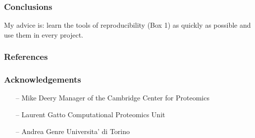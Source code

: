 \documentclass{beamer}
\begin{document}
\begin{frame}
\frametitle{Conclusions}

My advice is: learn the tools of reproducibility (Box 1) as quickly as possible and use them in every project.
\end{frame}


\begin{frame}
\frametitle{References}
\fontsize{6}{7.2}\selectfont


\end{frame}

\begin{frame}
\frametitle{Acknowledgements}
\begin{itemize}
\item[--] \Large Mike Deery \small{ Manager of the Cambridge Center for Proteomics}
\item[--] \Large Laurent Gatto \small{Computational Proteomics Unit}
\vspace{20px}
\item[--] \Large Andrea Genre \small{Universita' di Torino}
\end{itemize}
\end{frame}



\end{document}
